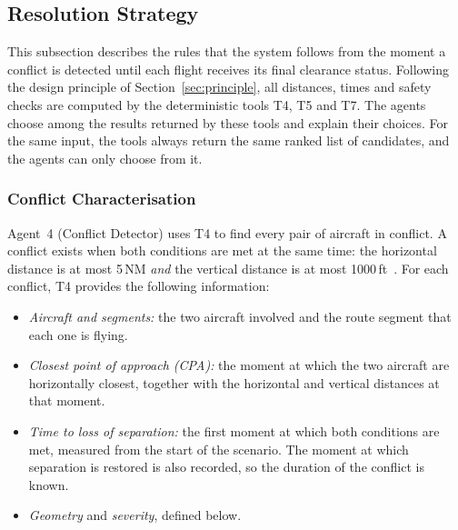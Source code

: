 

\begingroup
\setlength{\emergencystretch}{3em}
\subsection{Resolution Strategy}\label{sec:resolution}

This subsection describes the rules that the system follows from the moment a conflict is detected until each flight receives its final clearance status. Following the design principle of Section~\ref{sec:principle}, all distances, times and safety checks are computed by the deterministic tools T4, T5 and T7. The agents choose among the results returned by these tools and explain their choices. For the same input, the tools always return the same ranked list of candidates, and the agents can only choose from it.

\subsubsection{Conflict Characterisation}\label{sec:conflict-characterisation}

Agent~4 (Conflict Detector) uses T4 to find every pair of aircraft in conflict. A conflict exists when both conditions are met at the same time: the horizontal distance is at most 5\,NM \emph{and} the vertical distance is at most 1000\,ft~\cite{icao4444}. For each conflict, T4 provides the following information:
\begin{itemize}
    \item \emph{Aircraft and segments:} the two aircraft involved and the route segment that each one is flying.
    \item \emph{Closest point of approach (CPA):} the moment at which the two aircraft are horizontally closest, together with the horizontal and vertical distances at that moment.
    \item \emph{Time to loss of separation:} the first moment at which both conditions are met, measured from the start of the scenario. The moment at which separation is restored is also recorded, so the duration of the conflict is known.
    \item \emph{Geometry} and \emph{severity}, defined below.
\end{itemize}

